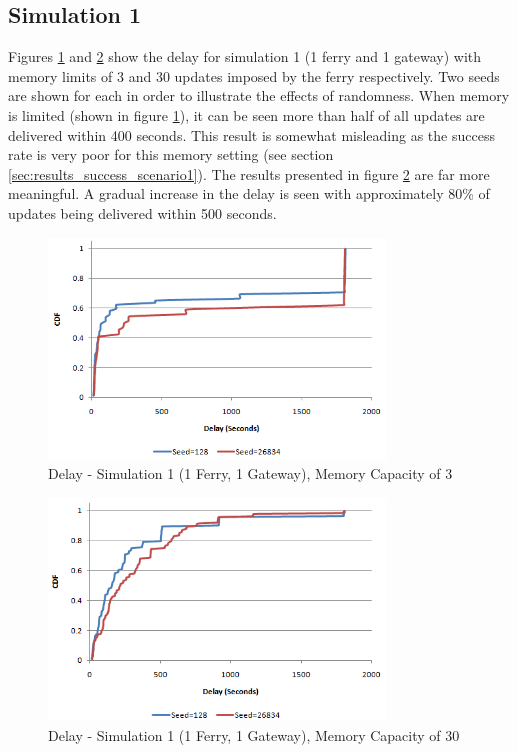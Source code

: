 \subsection{Simulation 1}

Figures \ref{fig:result_delay_sim1byseed_mc3} and \ref{fig:result_delay_sim1byseed_mc30} show the delay for simulation 1 (1 ferry and 1 gateway) with memory limits of 3 and 30 updates imposed by the ferry respectively.
Two seeds are shown for each in order to illustrate the effects of randomness.
When memory is limited (shown in figure \ref{fig:result_delay_sim1byseed_mc3}), it can be seen more than half of all updates are delivered within 400 seconds. 
This result is somewhat misleading as the success rate is very poor for this memory setting (see section \ref{sec:results_success_scenario1}).
The results presented in figure \ref{fig:result_delay_sim1byseed_mc30} are far more meaningful.
A gradual increase in the delay is seen with approximately 80\% of updates being delivered within 500 seconds.

\begin{figure}[htbp]
    \centering
    \includegraphics[width=0.8\textwidth]{images/result_delay_sim1byseed_mc3.png}
    \caption{Delay - Simulation 1 (1 Ferry, 1 Gateway), Memory Capacity of 3}
    \label{fig:result_delay_sim1byseed_mc3}
\end{figure}

\begin{figure}[htbp]
    \centering
    \includegraphics[width=0.8\textwidth]{images/result_delay_sim1byseed_mc30.png}
    \caption{Delay - Simulation 1 (1 Ferry, 1 Gateway), Memory Capacity of 30}
    \label{fig:result_delay_sim1byseed_mc30}
\end{figure}

